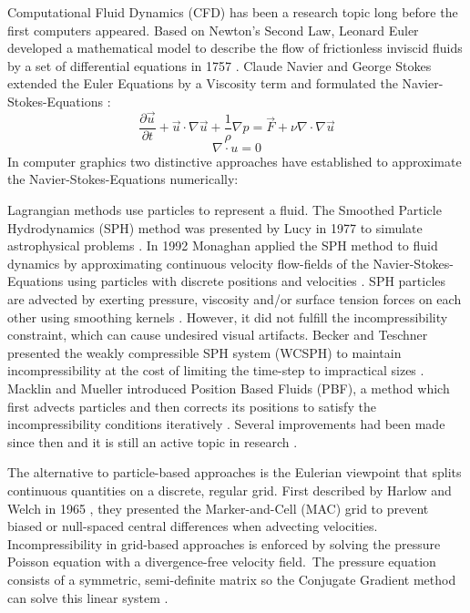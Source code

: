 Computational Fluid Dynamics (CFD) has been a research topic long before the first computers appeared. Based on Newton's Second Law, Leonard Euler developed a mathematical model to describe the flow of frictionless inviscid fluids by a set of differential equations in 1757 \parencite{euler1757principes}. Claude Navier and George Stokes extended the Euler Equations by a Viscosity term and formulated the Navier-Stokes-Equations \parencite{navier1827memoire} \parencite{stokes1880theories}:
\[
    \frac{\partial \vec{u}}{\partial t} + \vec{u} \cdot \nabla \vec{u} + \frac{1}{\rho}  \nabla p = \vec{F} + \nu \nabla \cdot \nabla \vec{u}
\]
\[
    \nabla \cdot u = 0
\]
In computer graphics two distinctive approaches have established to approximate the Navier-Stokes-Equations numerically: 
\par Lagrangian methods use particles to represent a fluid. The Smoothed Particle Hydrodynamics (SPH) method was presented by Lucy in 1977 to simulate astrophysical problems \parencite{lucy1977numerical}. In 1992 Monaghan applied the SPH method to fluid dynamics by approximating continuous velocity flow-fields of the Navier-Stokes-Equations using particles with discrete positions and velocities \parencite{monaghan1992smoothed}. SPH particles are advected by exerting pressure, viscosity and/or surface tension forces on each other using smoothing kernels \parencite{muller2003particle}. However, it did not fulfill the incompressibility constraint, which can cause undesired visual artifacts. Becker and Teschner presented the weakly compressible SPH system (WCSPH) to maintain incompressibility at the cost of limiting the time-step to impractical sizes \parencite{becker2007weakly}. Macklin and Mueller introduced Position Based Fluids (PBF), a method which first advects particles and then corrects its positions to satisfy the incompressibility conditions iteratively \parencite{macklin2013position}. Several improvements had been made since then and it is still an active topic in research \parencite{morikawaimprovements}.
\par The alternative to particle-based approaches is the Eulerian viewpoint that splits continuous quantities on a discrete, regular grid. First described by Harlow and Welch in 1965 \parencite{harlow1965numerical}, they presented the Marker-and-Cell (MAC) grid to prevent biased or null-spaced central differences when advecting velocities. Incompressibility in grid-based approaches is enforced by solving the pressure Poisson equation with a divergence-free velocity field. The pressure equation consists of a symmetric, semi-definite matrix so the Conjugate Gradient method can solve this linear system \parencite{hestenes1952methods}.
